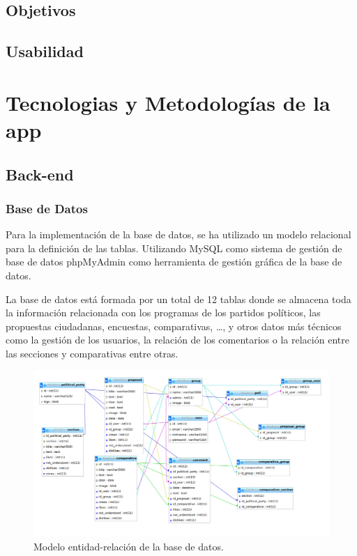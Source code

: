   \subsection{Objetivos}
  \subsection{Usabilidad}
  
  
\section{Tecnologias y Metodologías de la app}

	\subsection{Back-end}

  		\subsubsection{Base de Datos}\label{sssec:database}
Para la implementación de la base de datos, se ha utilizado un modelo relacional para la definición de las tablas. Utilizando MySQL \cite{ref:MySQL} como sistema de gestión de base de datos phpMyAdmin \cite{ref:phpMyAdmin} como herramienta de gestión gráfica de la base de datos.

La base de datos está formada por un total de 12 tablas donde se almacena toda la información relacionada con los programas de los partidos políticos, las propuestas ciudadanas, encuestas, comparativas, …, y otros datos más técnicos como la gestión de los usuarios, la relación de los comentarios o la relación entre las secciones y comparativas entre otras.

	\begin{figure}[H]
      \centering
	\includegraphics[keepaspectratio, scale=0.30]{Media/Captures/database.png}
      \caption{Modelo entidad-relación de la base de datos.}
      \label{fig:ermodel}
    \end{figure}
    
